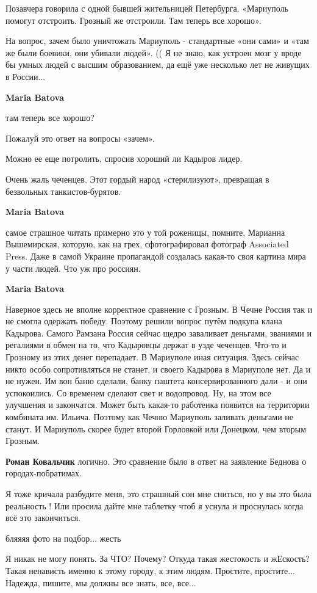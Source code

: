 \begin{itemize}

Позавчера говорила с одной бывшей жительницей Петербурга. «Мариуполь помогут
отстроить. Грозный же отстроили. Там теперь все хорошо».

На вопрос, зачем было уничтожать Мариуполь - стандартные «они сами» и «там же
были боевики, они убивали людей». (( Я не знаю, как устроен мозг у вроде бы
умных людей с высшим образованием, да ещё уже несколько лет не живущих в
России...

\begin{itemize} %
\textbf{Maria Batova} 

там теперь все хорошо?

Пожалуй это ответ на вопросы «зачем».

Можно ее еще потролить, спросив хороший ли Кадыров лидер.

Очень жаль чеченцев. Этот гордый народ «стерилизуют», превращая в безвольных
танкистов-бурятов.

\textbf{Maria Batova} 

самое страшное читать примерно это у той роженицы, помните, Марианна
Вышемирская, которую, как на грех, сфотографировал фотограф Associated Press.
Даже в самой Украине пропагандой создалась какая-то своя картина мира у части
людей. Что уж про россиян.

\textbf{Maria Batova} 

Наверное здесь не вполне корректное сравнение с Грозным. В Чечне Россия так и
не смогла одержать победу. Поэтому решили вопрос путём подкупа клана Кадырова.
Самого Рамзана Россия сейчас щедро заваливает деньгами, званиями и регалиями в
обмен на то, что Кадыровцы держат в узде чеченцев. Что-то и Грозному из этих
денег перепадает. В Мариуполе иная ситуация. Здесь сейчас никто особо
сопротивляться не станет, и своего Кадырова в Мариуполе нет. Да и не нужен. Им
вон баню сделали, банку паштета консервированного дали - и они успокоились. Со
временем сделают свет и водопровод. Ну, на этом все улучшения и закончатся.
Может быть какая-то работенка появится на территории комбината им. Ильича.
Поэтому как Чечню Мариуполь заливать деньгами не станут. И Мариуполь скорее
будет второй Горловкой или Донецком, чем вторым Грозным.

\textbf{Роман Ковальчик} логично. Это сравнение было в ответ на заявление Беднова о городах-побратимах.
\end{itemize} %


Я тоже кричала разбудите меня, это страшный сон мне сниться, но у вы это была
реальность ! Или просила дайте мне таблетку чтоб я уснула и проснулась когда
всё это закончиться.

бляяяя фото на подбор... жесть


Я никак не могу понять. За ЧТО? Почему? Откуда такая жестокость и жЕскость?
Такая ненависть именно к этому городу, к этим людям. Простите, простите...
Надежда, пишите, мы должны все знать, все, все...


\end{itemize} %
